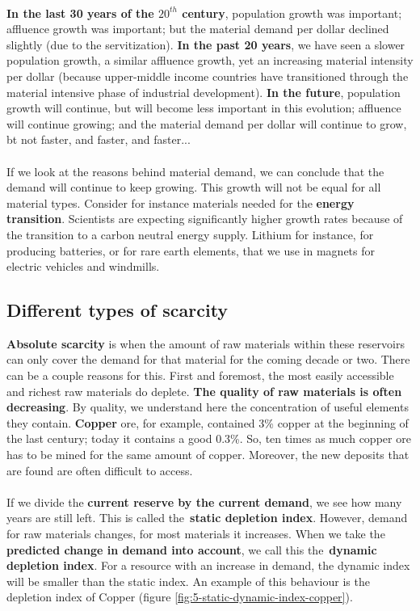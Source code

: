 \documentclass[../summary.tex]{subfiles}
\begin{document}
	\ \\
	\textbf{In the last 30 years of the $20^{th}$ century}, population growth was important; affluence growth was important; but the material demand per dollar declined slightly (due to the servitization). \textbf{In the past 20 years}, we have seen a slower population growth, a similar affluence growth, yet an increasing material intensity per dollar (because upper-middle income countries have transitioned through the material intensive phase of industrial development). \textbf{In the future}, population growth will continue, but will become less important in this evolution; affluence will continue growing; and the material demand per dollar will continue to grow, bt not faster, and faster, and faster...
	\\
	\\
	If we look at the reasons behind material demand, we can conclude that the demand will continue to keep growing. This growth will not be equal for all material types. Consider for instance materials needed for the \textbf{energy transition}. Scientists are expecting significantly higher growth rates because of the transition to a carbon neutral energy supply. Lithium for instance, for producing batteries, or for rare earth elements, that we use in magnets for electric vehicles and windmills.
	
	\subsection{Different types of scarcity}
	
	\textbf{Absolute scarcity} is when the amount of raw materials within these reservoirs can only cover the demand for that material for the coming decade or two. There can be a couple reasons for this. First and foremost, the most easily accessible and richest raw materials do deplete. \textbf{The quality of raw materials is often decreasing}. By quality, we understand here the concentration of useful elements they contain. \textbf{Copper} ore, for example, contained 3\% copper at the beginning of the last century; today it contains a good 0.3\%. So, ten times as much copper ore has to be mined for the same amount of copper. Moreover, the new deposits that are found are often difficult to access.
	\\\\
	If we divide the \textbf{current reserve by the current demand}, we see how many years are still left. This is called the \textbf{static depletion index}. However, demand for raw materials changes, for most materials it increases. When we take the \textbf{predicted change in demand into account}, we call this the \textbf{dynamic depletion index}. For a resource with an increase in demand, the dynamic index will be smaller than the static index. An example of this behaviour is the depletion index of Copper (figure \ref{fig:5-static-dynamic-index-copper}).
	
\end{document}
